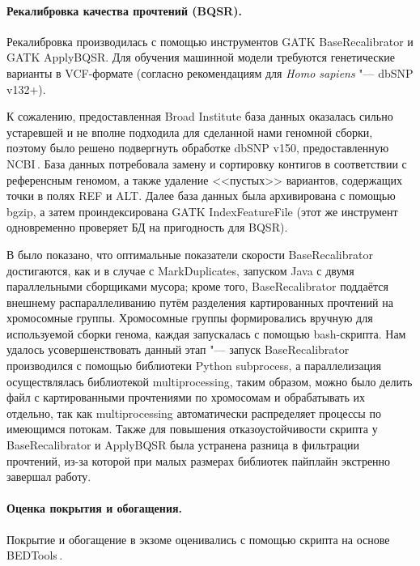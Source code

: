 \documentclass[a4paper,14pt]{extarticle}
\newcommand{\utilname}[1]{\textenglish{#1}}
\begin{document}
\paragraph{Рекалибровка качества прочтений (BQSR).}
Рекалибровка производилась с помощью инструментов \utilname{GATK BaseRecalibrator} и \utilname{GATK ApplyBQSR}.
Для обучения машинной модели требуются генетические варианты в VCF-формате (согласно рекомендациям для \textit{Homo sapiens} "--- dbSNP v132+).

К сожалению, предоставленная Broad Institute база данных оказалась сильно устаревшей и не вполне подходила для сделанной нами геномной сборки, поэтому было решено подвергнуть обработке dbSNP v150, предоставленную NCBI\,\citep{Sherry_2001}.
База данных потребовала замену и сортировку контигов в соответствии с референсным геномом, а также удаление <<пустых>> вариантов, содержащих точки в полях REF и ALT.
Далее база данных была архивирована с помощью \utilname{bgzip}, а затем проиндексирована \utilname{GATK IndexFeatureFile} (этот же инструмент одновременно проверяет БД на пригодность для BQSR).

В \citet{Heldenbrand_2019} было показано, что оптимальные показатели скорости \utilname{BaseRecalibrator} достигаются, как и в случае с \utilname{MarkDuplicates}, запуском \utilname{Java} с двумя параллельными сборщиками мусора;
кроме того, \utilname{BaseRecalibrator} поддаётся внешнему распараллеливанию путём разделения картированных прочтений на хромосомные группы.
Хромосомные группы формировались вручную для используемой сборки генома, каждая запускалась с помощью \utilname{bash}-скрипта.
Нам удалось усовершенствовать данный этап "--- запуск \utilname{BaseRecalibrator} производился с помощью библиотеки \utilname{Python} \utilname{subprocess}, а параллелизация осуществлялась библиотекой \utilname{multiprocessing}, таким образом, можно было делить файл с картированными прочтениями по хромосомам и обрабатывать их отдельно, так как \utilname{multiprocessing} автоматически распределяет процессы по имеющимся потокам.
Также для повышения отказоустойчивости скрипта у \utilname{BaseRecalibrator} и \utilname{ApplyBQSR} была устранена разница в фильтрации прочтений, из-за которой при малых размерах библиотек пайплайн экстренно завершал работу.

\paragraph{Оценка покрытия и обогащения.}
Покрытие и обогащение в экзоме оценивались с помощью скрипта на основе \utilname{BEDTools}\,\citep{Quinlan_2010}.
\end{document}
